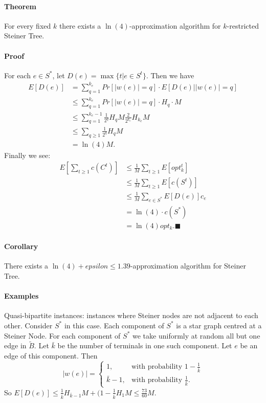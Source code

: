 \documentclass[letterpaper,12pt,oneside,onecolumn]{article}
\begin{document}
\paragraph{Theorem}
For every fixed $k$ there exists a $\ln(4)$-approximation algorithm for $k$-restricted Steiner Tree.
\paragraph{Proof}
For each $e \in S^*$, let $D(e) = \max\{t | e \in S^t\}$. Then we have
\begin{align*}
E[D(e)] &= \sum_{q=1}^{k_e} Pr[|w(e)|=q] \cdot E[D(e) | |w(e)|=q] \\
&\leq \sum_{q=1}^{k_e} Pr[|w(e)|=q] \cdot H_q \cdot M \\
&\leq \sum_{q=1}^{k_e-1}\frac{1}{2^q}H_qM  \frac{2}{2^{k_e}}H_{k_e}M \\
&\leq \sum_{q\geq 1} \frac{1}{2^q}H_q M \\
&= \ln(4) M.
\end{align*}
Finally we see:
\begin{align*}
E[\sum_{t\geq 1} c(C^t)] &\leq \frac{1}{M} \sum_{t\geq 1} E[opt_k^t] \\
&\leq \frac{1}{M} \sum_{t \geq 1} E[c(S^t)] \\
&\leq \frac{1}{M} \sum_{e\in S^*} E[D(e)]c_e \\
&=\ln(4) \cdot c(S^*) \\
&= \ln(4) opt_k.\blacksquare
\end{align*}
\paragraph{Corollary}
There exists a $\ln(4)+epsilon \leq 1.39$-approximation algorithm for Steiner Tree.
\paragraph{Examples}
Quasi-bipartite instances: instances where Steiner nodes are not adjacent to each other. Consider $S^*$ in this case. Each component of $S^*$ is a star graph centred at a Steiner Node. For each component of $S^*$ we take uniformly at random all but one edge in $\tilde{B}$. Let $\bar{k}$ be the number of terminals in one such component. Let $e$ be an edge of this component. Then
$$|w(e)| = \begin{cases}
1, &\text{with probability }1-\frac{1}{\bar{k}} \\
\bar{k}-1, &\text{with probability } \frac{1}{\bar{k}}.
\end{cases}$$
So $E[D(e)] \leq \frac{1}{\bar{k}}H_{\bar{k}-1}M + (1-\frac{1}{\bar{k}} H_1 M \leq \frac{73}{60}M$.
\end{document}
